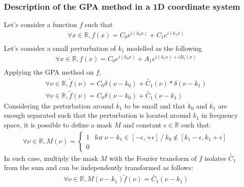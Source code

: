 \documentclass[12pt]{article}
\begin{document}
\subsubsection*{Description of the GPA method in a 1D coordinate system}
\noindent Let's consider a function $f$ such that 
\begin{equation*}
\begin{gathered}
\forall x \in \mathbb{R}, f(x)=C_0e^{i(k_0x)}+C_1e^{i(k_1x)} \\
\end{gathered}
\end{equation*}
Let's consider a small perturbation of $k_1$ modelled as the following
\begin{equation*}
\begin{gathered}
\forall x \in \mathbb{R}, f(x)=C_0e^{i(k_0x)}+A_1e^{i(k_1x)+iB_1(x)} \\
\end{gathered}
\end{equation*}
Applying the GPA method on $f$,
\begin{equation*}
\begin{gathered}
\forall \nu \in \mathbb{R}, \widetilde{f}(\nu)=C_0\delta(\nu-k_0)+\widetilde{C_1}(\nu)\ast\delta(\nu-k_1) \\
\forall \nu \in \mathbb{R}, \widetilde{f}(\nu)=C_0\delta(\nu-k_0)+\widetilde{C_1}(\nu-k_1)
\end{gathered}
\end{equation*}
Considering the perturbation around $k_1$ to be small and that $k_0$ and $k_1$ are enough separated such that the perturbation is located around $k_1$ in frequency space, it is possible to define a mask $M$ and constant $\epsilon \in \mathbb{R}$ such that:
\begin{equation*}
\begin{gathered}
\forall \nu \in \mathbb{R}, M(\nu) = 
\begin{cases}
1 & \text{for} \ \nu-k_1 \in  [-\epsilon,+\epsilon] \ / \ k_0 \notin [k_1-\epsilon,k_1+\epsilon] \\
0
\end{cases}
\end{gathered}
\end{equation*}
In such case, multiply the mask $M$ with the Fourier transform of $f$ isolates $\widetilde{C_1}$ from the sum and can be independently transformed as follows:
\begin{equation*}
\begin{gathered}
\forall \nu \in \mathbb{R}, M(\nu-k_1)\widetilde{f}(\nu)=\widetilde{C_1}(\nu-k_1)
\end{gathered}
\end{equation*}
\end{document}
